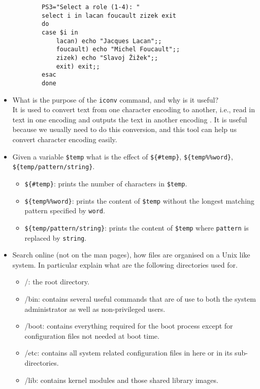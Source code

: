 \documentclass[a4paper]{article}
\begin{document}
\begin{itemize}
    \begin{verbatim}
        PS3="Select a role (1-4): "
        select i in lacan foucault zizek exit
        do
        case $i in
            lacan) echo "Jacques Lacan";;
            foucault) echo "Michel Foucault";;
            zizek) echo "Slavoj Žižek";;
            exit) exit;;
        esac
        done
    \end{verbatim}
    \item What is the purpose of the \texttt{iconv} command, and why is it useful?\\It is used to convert text from one character encoding to another, i.e., read in text in one encoding and outputs the text in another encoding \cite{iconv}. It is useful because we usually need to do this conversion, and this tool can help us convert character encoding easily.
    \item Given a variable \texttt{\$temp} what is the effect of \texttt{\$\{\#temp\}}, \texttt{\$\{temp\%\%word\}}, \texttt{\$\{temp/pattern/string\}}.\\
    \begin{itemize}
        \item \texttt{\$\{\#temp\}}: prints the number of characters in \texttt{\$temp}.
        \item \texttt{\$\{temp\%\%word\}}: prints the content of \texttt{\$temp} without the longest matching pattern specified by \texttt{word}.
        \item \texttt{\$\{temp/pattern/string\}}: prints the content of \texttt{\$temp} where \texttt{pattern} is replaced by \texttt{string}.
    \end{itemize}
    \item Search online (not on the man pages), how files are organised on a Unix like system. In particular explain what are the following directories used for.
    \begin{itemize}
        \item /: the root directory.
        \item /bin: contains several useful commands that are of use to both the system administrator as well as non-privileged users.
        \item /boot: contains everything required for the boot process except for configuration files not needed at boot time.
        \item /etc: contains all system related configuration files in here or in its sub-directories.
        \item /lib: contains kernel modules and those shared library images.

\end{itemize}
\end{itemize}
\end{document}
